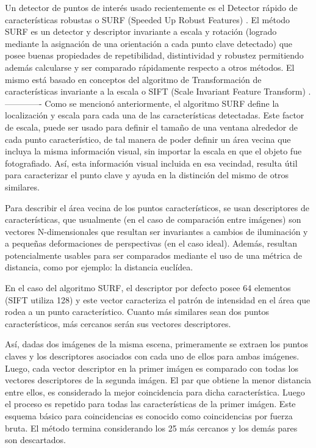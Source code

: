       Un detector de puntos de interés usado recientemente es el Detector rápido de características robustas o SURF (Speeded Up Robust Features) \cite{citeulike:9456628, citeulike:7676197, Bay:2008:SRF, bb53077, TuytelaarsM07, Bay:2008:SRF, BouGar}. El método SURF es un detector y descriptor invariante a escala y rotación (logrado mediante la asignación de una orientación a cada punto clave detectado) que posee buenas propiedades de repetibilidad, distintividad y robustez permitiendo además calcularse y ser comparado rápidamente respecto a otros métodos. El mismo está basado en conceptos del algoritmo de Transformación de características invariante a la escala o SIFT (Scale Invariant Feature Transform) \cite{citeulike:3484001, citeulike:9456628, citeulike:7676197, bb53077, journals/tvcg/WagnerRMDS10, TuytelaarsM07, bb48614, Nixon:2002:FEI, BouGar, 5739718, conf/ismar/2004}. 
      -------------
      Como se mencionó anteriormente, el algoritmo SURF define la localización y escala para cada una de las características detectadas. Este factor de escala, puede ser usado para definir el tamaño de una ventana alrededor de cada punto característico, de tal manera de poder definir un área vecina que incluya la misma información visual, sin importar la escala en que el objeto fue fotografiado. Así, esta información visual incluida en esa vecindad, resulta útil para caracterizar el punto clave y ayuda en la distinción del mismo de otros similares.

      Para describir el área vecina de los puntos característicos, se usan descriptores de características, que usualmente (en el caso de comparación entre imágenes) son vectores N-dimensionales que resultan ser invariantes a cambios de iluminación y a pequeñas deformaciones de perspectivas (en el caso ideal). Además, resultan potencialmente usables para ser comparados mediante el uso de una métrica de distancia, como por ejemplo: la distancia euclídea. 

      En el caso del algoritmo SURF, el descriptor por defecto posee 64 elementos (SIFT utiliza 128) y este vector caracteriza el patrón de intensidad en el área que rodea a un punto característico. Cuanto más similares sean dos puntos característicos, más cercanos serán sus vectores descriptores. 

      Así, dadas dos imágenes de la misma escena, primeramente se extraen los puntos claves y los descriptores asociados con cada uno de ellos para ambas imágenes. Luego, cada vector descriptor en la primer imágen es comparado con todas los vectores descriptores de la segunda imágen. El par que obtiene la menor distancia entre ellos, es considerado la mejor coincidencia para dicha característica. Luego el proceso es repetido para todas las características de la primer imágen. Este esquema básico para coincidencias es conocido como coincidencias por fuerza bruta. El método termina considerando los 25 más cercanos y los demás pares son descartados.

